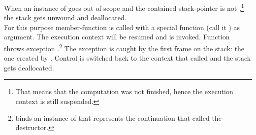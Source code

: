 
When an instance of \cont goes out of scope and the contained stack-pointer is
not \nullptr,\footnote{That means that the computation was not finished, hence
the execution context is still suspended.} the stack gets
unwound and deallocated.\\
For this purpose member-function \resumewith is called with a special function
(call it \unwindfn) as argument. The execution context will be
resumed and \unwindfn is invoked. Function \unwindfn throws exception
\unwindex.\footnote{\unwindex binds an instance of \cont that represents the
continuation that called the destructor.} The exception
is caught by the first frame on the stack: the one created by
\callcc. Control is switched back to the context that called
 and the stack gets deallocated.


